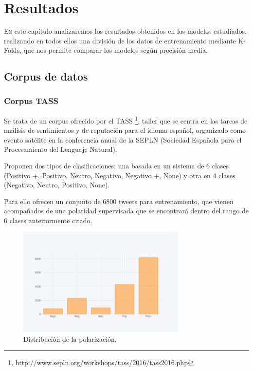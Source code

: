 
\chapter{Resultados}

\lettrine{E}{n} este capítulo analizaremos los resultados obtenidos en los modelos estudiados, realizando en todos ellos una división de los datos de entrenamiento mediante K-Folds, que nos permite comparar los modelos según precisión media.

\section{Corpus de datos}\label{corpus}

\subsection{Corpus TASS}
Se trata de un corpus ofrecido por el TASS \footnote{http://www.sepln.org/workshops/tass/2016/tass2016.php}, taller que se centra en las tareas de análisis de sentimientos y de reputación para el idioma español, organizado como evento satélite en la conferencia anual de la SEPLN (Sociedad Española para el Procesamiento del Lenguaje Natural).

Proponen dos tipos de clasificaciones: una basada en un sistema de 6 clases (Positivo +, Positivo, Neutro, Negativo, Negativo +, None) y otra en 4 clases (Negativo, Neutro, Positivo, None).

Para ello ofrecen un conjunto de 6800 tweets para entrenamiento, que vienen acompañados de una polaridad supervisada que se encontrará dentro del rango de 6 clases anteriormente citado.

\begin{figure}[!ht]
	\centering
	\includegraphics[width=0.75\textwidth]{imaxes/distTass.png}
	\caption{Distribución de la polarización.}
	\label{dist_tass}
\end{figure}

